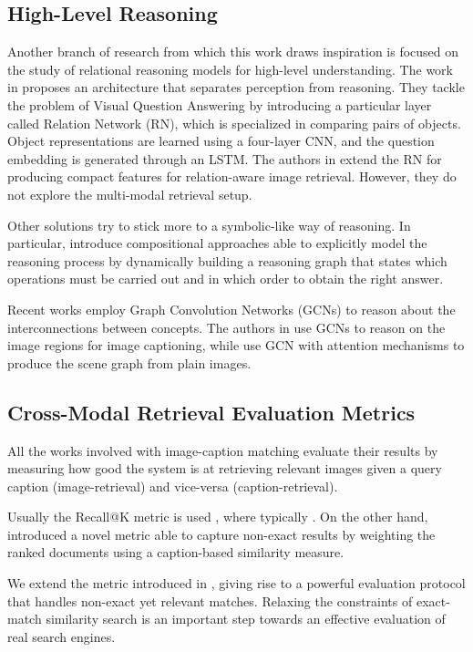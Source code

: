 \documentclass[acmsmall]{acmart}
\begin{document}
\subsection*{High-Level Reasoning}
Another branch of research from which this work draws inspiration is focused on the study of relational reasoning models for high-level understanding. The work in \cite{santoro2017rn} proposes an architecture that separates perception from reasoning. They tackle the problem of Visual Question Answering by introducing a particular layer called Relation Network (RN), which is specialized in comparing pairs of objects. Object representations are learned using a four-layer CNN, and the question embedding is generated through an LSTM. The authors in \cite{messina2019avfrn,DBLP:messina2019cbir} extend the RN for producing compact features for relation-aware image retrieval. However, they do not explore the multi-modal retrieval setup.

Other solutions try to stick more to a symbolic-like way of reasoning. In particular, \cite{hu2017learning,inferring_and_executing_programs} introduce compositional approaches able to explicitly model the reasoning process by dynamically building a reasoning graph that states which operations must be carried out and in which order to obtain the right answer.

Recent works employ Graph Convolution Networks (GCNs) to reason about the interconnections between concepts. The authors in \cite{YaoPLM18,YangTZC19,LiJ19} use GCNs to reason on the image regions for image captioning, while \cite{YangLLBP18graphrcnn,LiOZSZW18} use GCN with attention mechanisms to produce the scene graph from plain images.

\subsection*{Cross-Modal Retrieval Evaluation Metrics}
All the works involved with image-caption matching evaluate their results by measuring how good the system is at retrieving relevant images given a query caption (image-retrieval) and vice-versa (caption-retrieval). 

Usually the Recall@K metric is used \cite{vsepp2018faghri,li2019,qi2020imagebert,lu2019vilbert,lee2019}, where typically .
On the other hand, \cite{carrara2018pictureit} introduced a novel metric able to capture non-exact results by weighting the ranked documents using a caption-based similarity measure.

We extend the metric introduced in \cite{carrara2018pictureit}, giving rise to a powerful evaluation protocol that handles non-exact yet relevant matches. Relaxing the constraints of exact-match similarity search is an important step towards an effective evaluation of real search engines.
\end{document}
